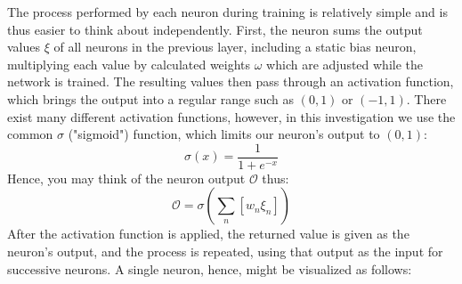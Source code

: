 \documentclass{article}
\begin{document}
The process performed by each neuron during training is relatively simple and is thus easier to think about independently. First, the neuron sums the output values $\xi$ of all neurons in the previous layer, including a static bias neuron, multiplying each value by calculated weights $\omega$ which are adjusted while the network is trained. The resulting values then pass through an activation function, which brings the output into a regular range such as $(0, 1)$ or $(-1, 1)$. There exist many different activation functions, however, in this investigation we use the common $\sigma$ ("sigmoid") function, which limits our neuron's output to $(0, 1)$:
$$\sigma(x)=\frac{1}{1+e^{-x}}$$
Hence, you may think of the neuron output $\mathcal{O}$ thus:
$$\mathcal{O}=\sigma(\sum_n[w_{n}\xi_{n}])$$
After the activation function is applied, the returned value is given as the neuron's output, and the process is repeated, using that output as the input for successive neurons. A single neuron, hence, might be visualized as follows:

\begin{center}
\end{center}
\end{document}
